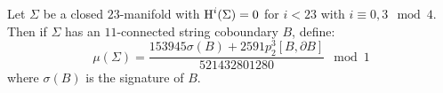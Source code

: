 %
%
%
%

\begin{definition*}
	Let $\Sigma$ be a closed $23$-manifold with $\operatorname{H}^i(\Sigma)=0$ for $i<23$ with $i\equiv 0,3\mod 4$. Then if $\Sigma$ has an $11$-connected string coboundary $B$, define: 
	\[
		\mu(\Sigma) = \frac{153945\sigma(B) + 2591p_2^3[B, \partial B]}{521432801280}\mod 1
	\]
	where $\sigma(B)$ is the signature of $B$.
\end{definition*}
